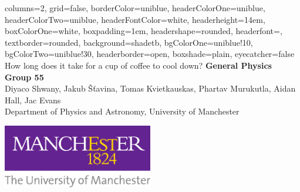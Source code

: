 \documentclass[a0paper,portrait, 3pt]{baposter}
\begin{document}

\begin{poster}{
  columns=2,
	grid=false,
	borderColor=uniblue,
	headerColorOne=uniblue,
	headerColorTwo=uniblue,
	headerFontColor=white,
  headerheight=14em,
	boxColorOne=white,
  boxpadding=1em,
	headershape=rounded,
	headerfont=\Large\textsf,
	textborder=rounded,
	background=shadetb,
  bgColorOne=uniblue!10,
  bgColorTwo=uniblue!30,
	headerborder=open,
  boxshade=plain,
  eyecatcher=false
}
{ %
}
{\vspace{1.25em} 
\smaller How long does it take for a cup of coffee to cool down?}
{
  \vspace{1.5em}
  {  \textbf{General Physics Group 55} \\
	{\smaller Diyaco Shwany, Jakub \v{S}\v{t}avina, Tomas Kvietkauskas, Phartav Murukutla, Aidan Hall, Jac Evans \\ 
    \textcolor{mcr_purple}{\smaller Department of Physics and Astronomy, University of Manchester}
    }
}
}
{\begin{minipage}{18.0em}
    \includegraphics[height=7.5em]{logo-uni.pdf}
  \end{minipage}}

\end{poster}
\end{document}
